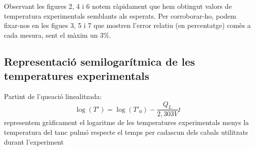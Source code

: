 \documentclass[10pt, twoside]{article}
\begin{document}
Observant les figures 2, 4 i 6 notem ràpidament que hem obtingut valors de temperatura experimentals semblants als esperats. Per corroborar-ho, podem fixar-nos en les figues 3, 5 i 7 que mostren l'error relatiu (en percentatge) comès a cada mesura, sent el màxim un 3\%.

\subsection{Representació semilogarítmica de les temperatures experimentals}
Partint de l'queació linealitzada: 
\begin{equation}
    \log(T') = \log(T'_0) - \frac{Q_L}{2,303V} t
\end{equation}
representem gràficament el logaritme de les temperatures experimentals menys la temperatura del tanc pulmó respecte el temps per cadascun dels cabals utilitzats durant l'experiment
\end{document}
